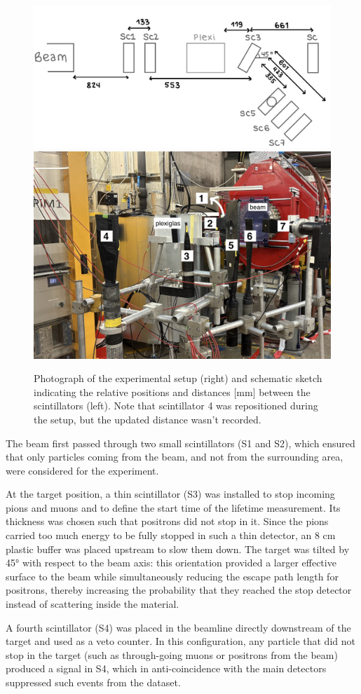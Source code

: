 \documentclass[11pt,a4paper]{article}
\begin{document}
\begin{figure}[h]
    \centering
    \includegraphics[width=0.49\linewidth]{Set up 1.jpeg}
    \includegraphics[width=0.45\linewidth]{Set up 2.jpg}
    \caption{Photograph of the experimental setup (right) and schematic sketch indicating the relative positions and distances [mm] between the scintillators (left). Note that scintillator 4 was repositioned during the setup, but the updated distance wasn't recorded.}
    \label{setup}
\end{figure}

The beam first passed through two small scintillators (S1 and S2), which  ensured that only particles coming from the beam, and not from the surrounding area, were considered for the experiment.

At the target position, a thin scintillator (S3) was installed to stop incoming pions and muons and to define the start time of the lifetime measurement. Its thickness was chosen such that positrons did not stop in it. Since the pions carried too much energy to be fully stopped in such a thin detector, an 8 cm plastic buffer was placed upstream to slow them down. The target was tilted by 45° with respect to the beam axis: this orientation provided a larger effective surface to the beam while simultaneously reducing the escape path length for positrons, thereby increasing the probability that they reached the stop detector instead of scattering inside the material.

A fourth scintillator (S4) was placed in the beamline directly downstream of the target and used as a veto counter. In this configuration, any particle that did not stop in the target (such as through-going muons or positrons from the beam) produced a signal in S4, which in anti-coincidence with the main detectors suppressed such events from the dataset.
\end{document}
